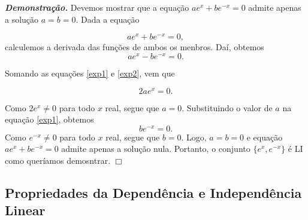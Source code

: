 \begin{enumerate}
\textbf{\textit{Demonstração.}} Devemos mostrar que a equação $ae^x+ be^{-x}=0$ admite apenas a solução $a=b=0$.  Dada a equação

\begin{equation}
ae^x+ be^{-x}=0, \label{exp1}
\end{equation}
calculemos  a derivada das funções de  ambos os menbros. Daí,  obtemos
\begin{equation}
ae^x- be^{-x}=0.\label{exp2}
\end{equation}

Somando as equações \eqref{exp1} e \eqref{exp2}, vem que

\begin{equation*}
2ae^x=0.
\end{equation*}

Como $2e^x \neq 0$ para todo $x$ real, segue que $a=0$.  Substituindo  o valor de $a$ na equação \eqref{exp1}, obtemos
\begin{equation*}
be^{-x}=0.
\end{equation*}
Como $e^{-x}\neq 0$ para todo $x$ real, segue que $b=0$. Logo, $a=b=0$  e equação $ae^x+ be^{-x}=0$  admite apenas a solução nula. Portanto, o conjunto $\{ e^x, e^{-x}\}$
é LI como queríamos demosntrar. $\Box$
\end{enumerate}

\subsection{Propriedades da Dependência e Independência Linear}

